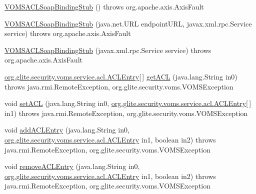 \begin{DoxyCompactItemize}
\item 
\hyperlink{classorg_1_1glite_1_1security_1_1voms_1_1service_1_1acl_1_1VOMSACLSoapBindingStub_acd0be106e255e9b27065bb1bce02b5f2}{VOMSACLSoapBindingStub} ()  throws org.apache.axis.AxisFault 
\item 
\hyperlink{classorg_1_1glite_1_1security_1_1voms_1_1service_1_1acl_1_1VOMSACLSoapBindingStub_ae8bc8419c751f31794b06e01b5f0df66}{VOMSACLSoapBindingStub} (java.net.URL endpointURL, javax.xml.rpc.Service service)  throws org.apache.axis.AxisFault 
\item 
\hyperlink{classorg_1_1glite_1_1security_1_1voms_1_1service_1_1acl_1_1VOMSACLSoapBindingStub_a8e98d088f6b37841a756394a67a2f26f}{VOMSACLSoapBindingStub} (javax.xml.rpc.Service service)  throws org.apache.axis.AxisFault 
\item 
\hyperlink{classorg_1_1glite_1_1security_1_1voms_1_1service_1_1acl_1_1ACLEntry}{org.glite.security.voms.service.acl.ACLEntry}\mbox{[}$\,$\mbox{]} \hyperlink{classorg_1_1glite_1_1security_1_1voms_1_1service_1_1acl_1_1VOMSACLSoapBindingStub_afccbc2e3203b4e039522519d1a512627}{getACL} (java.lang.String in0)  throws java.rmi.RemoteException, org.glite.security.voms.VOMSException 
\item 
void \hyperlink{classorg_1_1glite_1_1security_1_1voms_1_1service_1_1acl_1_1VOMSACLSoapBindingStub_a5b8d7f78d0d78b5894dbd2ae2944ecef}{setACL} (java.lang.String in0, \hyperlink{classorg_1_1glite_1_1security_1_1voms_1_1service_1_1acl_1_1ACLEntry}{org.glite.security.voms.service.acl.ACLEntry}\mbox{[}$\,$\mbox{]} in1)  throws java.rmi.RemoteException, org.glite.security.voms.VOMSException 
\item 
void \hyperlink{classorg_1_1glite_1_1security_1_1voms_1_1service_1_1acl_1_1VOMSACLSoapBindingStub_ab78a2f49c37d120df3065bae48af139c}{addACLEntry} (java.lang.String in0, \hyperlink{classorg_1_1glite_1_1security_1_1voms_1_1service_1_1acl_1_1ACLEntry}{org.glite.security.voms.service.acl.ACLEntry} in1, boolean in2)  throws java.rmi.RemoteException, org.glite.security.voms.VOMSException 
\item 
void \hyperlink{classorg_1_1glite_1_1security_1_1voms_1_1service_1_1acl_1_1VOMSACLSoapBindingStub_ab5df328ae62515a8ef7806eed3afe60a}{removeACLEntry} (java.lang.String in0, \hyperlink{classorg_1_1glite_1_1security_1_1voms_1_1service_1_1acl_1_1ACLEntry}{org.glite.security.voms.service.acl.ACLEntry} in1, boolean in2)  throws java.rmi.RemoteException, org.glite.security.voms.VOMSException 
\item 

\end{DoxyCompactItemize}

